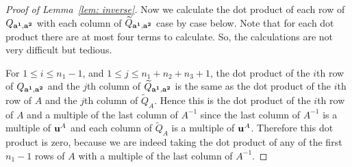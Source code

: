 \documentclass[11pt]{amsart}
\theoremstyle{plain}
\theoremstyle{definition}
\theoremstyle{remark}
\numberwithin{theorem}{section}
\begin{document}
\begin{proof} [Proof of Lemma~\ref{lem: inverse}]
Now we calculate the dot product of each row of $Q_{{\bf a^1}, {\bf a^2}}$ with each column of  $\widetilde{Q}_{{\bf a^1}, {\bf a^2}}$ case by case below. Note that for each dot product there are at most four terms to calculate. So, the calculations are not very difficult but tedious. 

For $1 \leq i \leq n_1-1$, and $1 \leq j \leq n_1+n_2+n_3+1$, the dot product of the $i$th row of $Q_{{\bf a^1}, {\bf a^2}}$  and the $j$th  column of $\widetilde{Q}_{{\bf a^1}, {\bf a^2}}$ is the same as the dot product of the $i$th row of $A$ and the  $j$th  column of $\widetilde{Q}_A$. Hence this is the dot product of the $i$th row of $A$ and a multiple of the last column of $A^{-1}$ since the last column of $A^{-1}$ is a multiple of ${\bf u}^A$ and each column of $\widetilde{Q}_A$ is a multiple of ${\bf u}^A$. Therefore this dot product is zero, because we are indeed taking the dot product of any of the first $n_1-1$ rows of $A$ with a multiple of the last column of $A^{-1}$.  


\end{proof}
\end{document}
